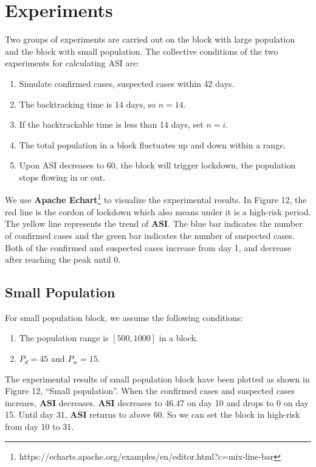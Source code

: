 \documentclass[sigplan,screen]{acmart}
\begin{document}
\section{Experiments}
Two groups of experiments are carried out on the block with large population and the block with small population.
The collective conditions of the two experiments for calculating ASI are:
\begin{enumerate}
	\item Simulate confirmed cases, suspected cases within 42 days.
	\item The backtracking time is 14 days, so $n=14$.
	\item If the backtrackable time is less than 14 days, set $n=i$.
	\item The total population in a block fluctuates up and down within a range.
	\item Upon ASI decreases to 60, the block will trigger lockdown, the population stops flowing in or out.
\end{enumerate}
We use \textbf{Apache Echart}\footnote{https://echarts.apache.org/examples/en/editor.html?c=mix-line-bar} to visualize the experimental results.
In Figure 12, the red line is the cordon of lockdown which also means under it is a high-risk period.
The yellow line represents the trend of \textbf{ASI}.
The blue bar indicates the number of confirmed cases and the green bar indicates the number of suspected cases.
Both of the confirmed and suspected cases increase from day 1, and decrease after reaching the peak until 0.

\subsection{Small Population}
For small population block, we assume the following conditions:
\begin{enumerate}
	\item The population range is $[500,1000]$ in a block.
	\item $P_d=45$ and $P_w=15$.
\end{enumerate}
The experimental results of small population block have been plotted as shown in Figure 12, ``Small population''.
When the confirmed cases and suspected cases increaes, \textbf{ASI} decreases.
\textbf{ASI} decreases to $46.47$ on day 10 and drops to $0$ on day 15.
Until day 31, \textbf{ASI} returns to above 60.
So we can set the block in high-risk from day 10 to 31.
\end{document}
